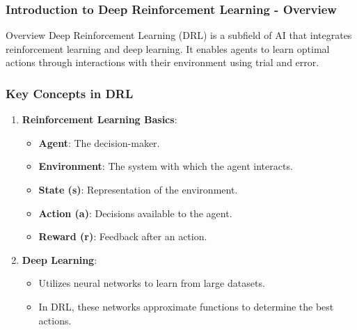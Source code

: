 \documentclass[aspectratio=169]{beamer}
\begin{document}
\frame{\titlepage}

\begin{frame}[fragile]
    \maketitle
\end{frame}

\begin{frame}[fragile]
    \frametitle{Introduction to Deep Reinforcement Learning - Overview}
    
    \begin{block}{Overview}
        Deep Reinforcement Learning (DRL) is a subfield of AI that integrates reinforcement learning and deep learning. It enables agents to learn optimal actions through interactions with their environment using trial and error.
    \end{block}

\end{frame}

\begin{frame}[fragile]
    \frametitle{Key Concepts in DRL}
    
    \begin{enumerate}
        \item \textbf{Reinforcement Learning Basics}:
        \begin{itemize}
            \item \textbf{Agent}: The decision-maker.
            \item \textbf{Environment}: The system with which the agent interacts.
            \item \textbf{State (s)}: Representation of the environment.
            \item \textbf{Action (a)}: Decisions available to the agent.
            \item \textbf{Reward (r)}: Feedback after an action.
        \end{itemize}
        
        \item \textbf{Deep Learning}:
        \begin{itemize}
            \item Utilizes neural networks to learn from large datasets.
            \item In DRL, these networks approximate functions to determine the best actions.
        \end{itemize}
    \end{enumerate}

\end{frame}
\end{document}
